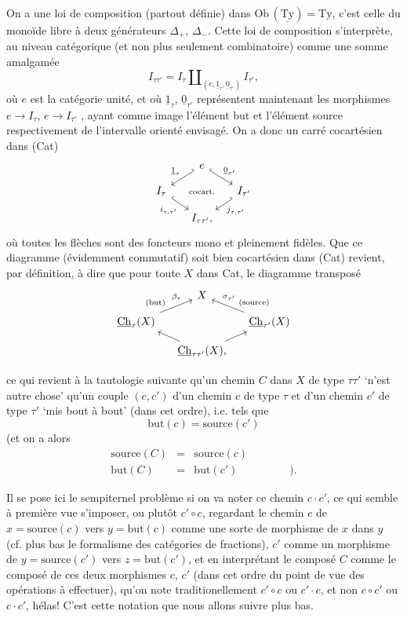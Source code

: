 \documentclass[11pt]{article}
\newcommand{\printedpage}[1]{\marginpar{\footnotesize p.~#1}}
\newcommand{\msp}[1]{\marginpar{\footnotesize [#1]}}
\newcommand{\uCh}{\underline{\mathrm{Ch}}}
\newcommand{\Ty}{\mathrm{Ty}}
\newcommand{\uTy}{\underline{\mathrm{Ty}}}
\begin{document}
On a une loi de composition (partout définie) dans $\mathrm{Ob}\,(\uTy) = \Ty$, c'est celle du monoïde libre à deux générateurs $\Delta_+$, $\Delta_-$. Cette loi de composition s'interprète, au niveau catégorique (et non plus seulement combinatoire) comme une somme amalgamée
\[
I_{\tau\tau'} = I_\tau \amalg_{(e, \underline{1}_\tau, \underline{0}_{\tau'})} I_{\tau'},
\]
où $e$ est la catégorie unité, et où $\underline{1}_\tau$, $\underline{0}_{\tau'}$ représentent maintenant les morphismes $e \longrightarrow I_\tau$, $e \longrightarrow I_{\tau'}$ , ayant comme image l'élément but et l'élément source respectivement de l'intervalle orienté envisagé. On a donc un carré cocartésien dans (Cat)
\[
\begin{tikzcd}[column sep=small, row sep=small]
 & e \arrow[dl, hook', "\underline{1}_\tau"'] \arrow[dr, hook, "\underline{0}_{\tau'}"] & \\
I_\tau \arrow[dr, hook, "i_{\tau,\tau'}"'] & \text{\scriptsize cocart.} & I_{\tau'} \arrow[dl, hook', "j_{\tau,\tau'}"] \\
 & I_{\tau\tau'}, &
\end{tikzcd}
\]
où toutes les flèches sont des foncteurs mono et pleinement fidèles. Que ce diagramme (évidemment commutatif) soit bien cocartésien dans (Cat) revient, par définition, à dire que pour toute $X$ dans Cat, le diagramme transposé
\[
\begin{tikzcd}[column sep=small, row sep=small]
 & X & \\
\uCh_\tau(X) \arrow[ur, "\beta_\tau" near end, "\text{\scriptsize (but)}" near start] & & \uCh_{\tau'}(X) \arrow[ul, "\sigma_{\tau'}"' near end, "\text{\scriptsize (source)}"' near start] \\
 & \uCh_{\tau\tau'}(X), \arrow[ul] \arrow[ur] &
\end{tikzcd}
\]



\msp{page 49}ce qui revient à la tautologie suivante qu'un chemin $C$ dans $X$ de type $\tau\tau'$ `n'est autre chose' qu'un couple $(c,c')$ d'un chemin $c$ de type $\tau$ et d'un chemin $c'$ de type $\tau'$ `mis bout à bout' (dans cet ordre), i.e. tels que
\[
\mathrm{but}(c) = \mathrm{source}(c')
\]
(et on a alors
\[
\begin{array}{rcll}
\mathrm{source}(C) & = & \mathrm{source}(c) & \\[1ex]
\mathrm{but}(C) & = & \mathrm{but}(c') & \qquad\quad ).
\end{array}
\]

\printedpage{33}
Il se pose ici le sempiternel problème si on va noter ce chemin $c{\cdot}c'$, ce qui semble à première vue s'imposer, ou plutôt $c' \circ c$, regardant le chemin $c$ de $x = \mathrm{source}(c)$ vers $y = \mathrm{but}(c)$ comme une sorte de morphisme de $x$ dans $y$ (cf. plus bas le formalisme des catégories de fractions), $c'$ comme un morphisme de $y = \mathrm{source}(c')$ vers $z = \mathrm{but}(c')$, et en interprétant le composé $C$ comme le composé de ces deux morphismes $c$, $c'$ (dans cet ordre du point de vue des opérations à effectuer), qu'on note traditionellement $c' \circ c$ ou $c' \cdot c$, et non $c \circ c'$ ou $c \cdot c'$, hélas! C'est cette notation que nous allons suivre plus bas. %
\end{document}
